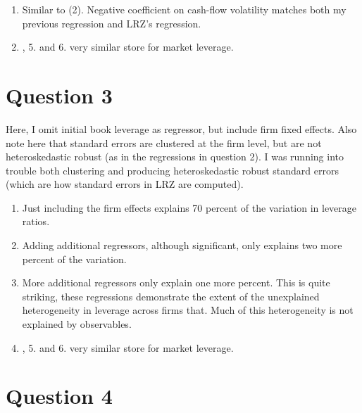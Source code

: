 \documentclass{article}
\begin{document}
\begin{landscape}
\begin{enumerate}
\item Similar to (2). Negative coefficient on cash-flow volatility matches both my previous regression and LRZ's regression.

\item , 5. and 6. very similar store for market leverage.

\end{enumerate}

\bigskip



\pagebreak

\section{Question 3}

Here, I omit initial book leverage as regressor, but include firm fixed effects.  Also note here that standard errors are clustered at the firm level, but are not heteroskedastic robust (as in the regressions in question 2).  I was running into trouble both clustering and producing heteroskedastic robust standard errors (which are how standard errors in LRZ are computed).

\begin{enumerate}

\item Just including the firm effects explains 70 percent of the variation in leverage ratios.

\item Adding additional regressors, although significant, only explains two more percent of the variation.

\item More additional regressors only explain one more percent.  This is quite striking, these regressions demonstrate the extent of the unexplained heterogeneity in leverage across firms that.  Much of this heterogeneity is not explained by observables.

\item, 5. and 6. very similar store for market leverage.

\end{enumerate}



\end{landscape}

\pagebreak

\section{Question 4}
\end{document}
